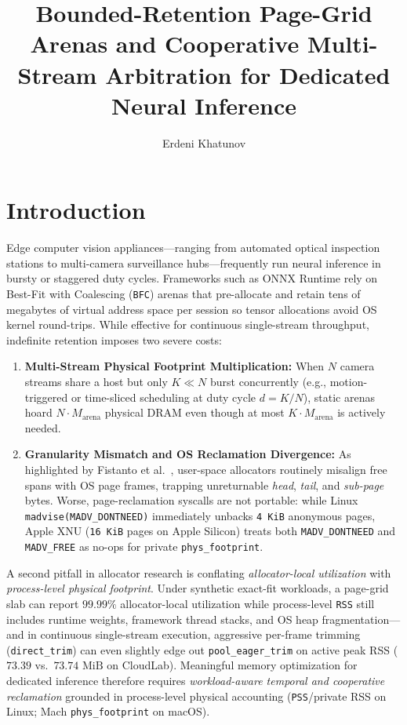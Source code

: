 \documentclass[sigconf,screen]{acmart}
\title{Bounded-Retention Page-Grid Arenas and Cooperative Multi-Stream Arbitration for Dedicated Neural Inference}
\author{Erdeni Khatunov}
\affiliation{%
  \institution{Shanghai Jiao Tong University (Student ID: 126033990029, Group GE6001-03300-M03)}
  \city{Shanghai}
  \country{China}
}
\begin{document}
\maketitle

\section{Introduction}
Edge computer vision appliances---ranging from automated optical inspection stations to multi-camera surveillance hubs---frequently run neural inference in bursty or staggered duty cycles. Frameworks such as ONNX Runtime rely on Best-Fit with Coalescing (\texttt{BFC}) arenas that pre-allocate and retain tens of megabytes of virtual address space per session so tensor allocations avoid OS kernel round-trips. While effective for continuous single-stream throughput, indefinite retention imposes two severe costs:
\begin{enumerate}
  \item \textbf{Multi-Stream Physical Footprint Multiplication:} When $N$ camera streams share a host but only $K \ll N$ burst concurrently (e.g., motion-triggered or time-sliced scheduling at duty cycle $d = K/N$), static arenas hoard $N \cdot M_{\text{arena}}$ physical DRAM even though at most $K \cdot M_{\text{arena}}$ is actively needed.
  \item \textbf{Granularity Mismatch and OS Reclamation Divergence:} As highlighted by Fistanto et al.~\cite{fistanto2023lostbytes}, user-space allocators routinely misalign free spans with OS page frames, trapping unreturnable \textit{head}, \textit{tail}, and \textit{sub-page} bytes. Worse, page-reclamation syscalls are not portable: while Linux \texttt{madvise(MADV\_DONTNEED)} immediately unbacks \texttt{4~KiB} anonymous pages, Apple XNU (\texttt{16~KiB} pages on Apple Silicon) treats both \texttt{MADV\_DONTNEED} and \texttt{MADV\_FREE} as no-ops for private \texttt{phys\_footprint}.
\end{enumerate}

A second pitfall in allocator research is conflating \emph{allocator-local utilization} with \emph{process-level physical footprint}. Under synthetic exact-fit workloads, a page-grid slab can report $99.99\%$ allocator-local utilization while process-level \texttt{RSS} still includes runtime weights, framework thread stacks, and OS heap fragmentation---and in continuous single-stream execution, aggressive per-frame trimming (\texttt{direct\_trim}) can even slightly edge out \texttt{pool\_eager\_trim} on active peak RSS ($73.39$ vs.\ $73.74\text{ MiB}$ on CloudLab). Meaningful memory optimization for dedicated inference therefore requires \emph{workload-aware temporal and cooperative reclamation} grounded in process-level physical accounting (\texttt{PSS}/private RSS on Linux; Mach \texttt{phys\_footprint} on macOS).
\end{document}
